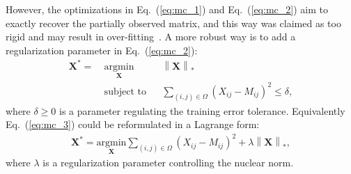 However, the optimizations in Eq.~(\ref{eq:mc_1}) and Eq.~(\ref{eq:mc_2}) aim to exactly recover the partially observed matrix, and this way was claimed as too rigid and may result in over-fitting~\cite{mazumder2010spectral}. A more robust way is to add a regularization parameter in Eq.~(\ref{eq:mc_2}):
\begin{equation}
    \label{eq:mc_3}
    \begin{aligned}
        \mathbf{X}^* = ~&\underset{\mathbf{X}}{\text{argmin}} 
               &&\left \| \mathbf{X} \right \|_*\\
               &\text{subject to}
               && \sum_{(i, j)\in \Omega}(X_{ij} - M_{ij})^2\leq \delta,
    \end{aligned}
\end{equation}
where $\delta \geq 0$ is a parameter regulating the training error tolerance. Equivalently Eq.~(\ref{eq:mc_3}) could be reformulated in a Lagrange form:
\begin{equation}
    \label{eq:mc_4}
    \begin{aligned}
        \mathbf{X}^* = \underset{\mathbf{X}}{\text{argmin}} \sum_{(i, j)\in \Omega} (X_{ij} - M_{ij})^2 + \lambda \left \|\mathbf{X} \right \|_{*},
    \end{aligned}
\end{equation}
where $\lambda$ is a regularization parameter controlling the nuclear norm.



